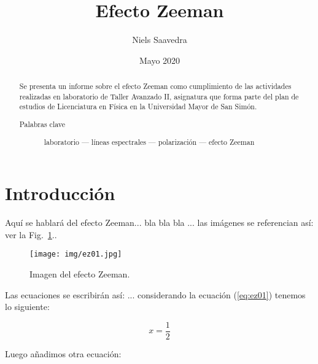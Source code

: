 \documentclass[%
 reprint,
 amsmath,amssymb,
 aps,
]{revtex4-2}
\begin{document}

\title{Efecto Zeeman}%

\author{Niels Saavedra}%
%

\makeatletter
\def\Dated@name{} %
\makeatother

\date{Mayo 2020}

\begin{abstract}
 Se presenta un informe sobre el efecto Zeeman como cumplimiento de las actividades realizadas en laboratorio de Taller Avanzado II, asignatura que forma parte del plan de estudios de Licenciatura en Física en la Universidad Mayor de San Simón.
\begin{description}
\item[Palabras clave] laboratorio — líneas espectrales — polarización — efecto Zeeman
\end{description}
\end{abstract}

\maketitle


\section{\label{sec:level1}Introducción}

Aquí se hablará del efecto Zeeman... bla bla bla ... las imágenes se referencian así: ver la Fig.~\ref{fig:ez01}..

\begin{figure}[H]
\centering
\texttt{[image: img/ez01.jpg]}
\caption{\label{fig:ez01} Imagen del efecto Zeeman.}
\end{figure}

Las ecuaciones se escribirán así: ... considerando la ecuación (\ref{eq:ez01}) tenemos lo siguiente:

\begin{equation}
\label{eq:ez01}
x = \frac{1}{2}
\end{equation}

Luego añadimos otra ecuación:
\end{document}
